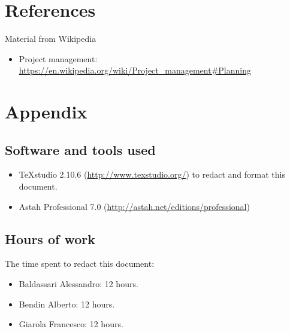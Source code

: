 \documentclass[a4paper,11pt]{report} %
\begin{document}
	\pagebreak
	\section{References}
		Material from Wikipedia
		\begin{itemize}
			\item Project management: \href{https://en.wikipedia.org/wiki/Project\_management\#Planning}{https://en.wikipedia.org/wiki/Project\_management\#Planning}
		\end{itemize}
	
	\section{Appendix}
		\subsection{Software and tools used}
		\begin{itemize}
			\item TeXstudio 2.10.6 (\href{http://www.texstudio.org/}{http://www.texstudio.org/}) to redact and format this document.
			\item Astah Professional 7.0 (\href{http://astah.net/editions/professional}{http://astah.net/editions/professional}) 
		\end{itemize}
		
		\subsection{Hours of work} The time spent to redact this document:
		\begin{itemize}
			\item Baldassari Alessandro: 12 hours.
			\item Bendin Alberto: 12 hours.
			\item Giarola Francesco: 12 hours.
		\end{itemize}
\end{document}
